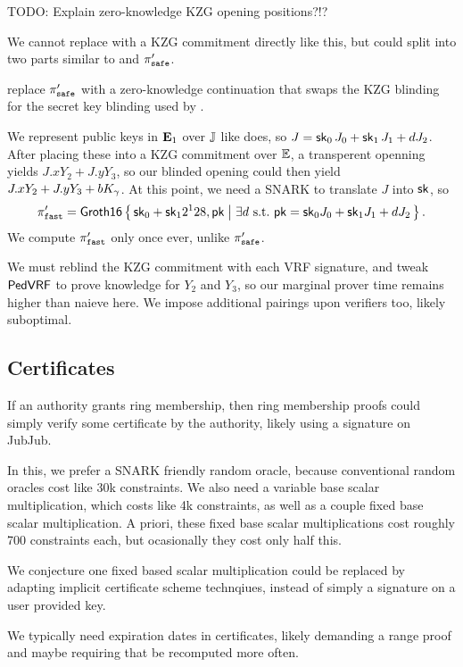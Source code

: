 TODO: Explain zero-knowledge KZG opening positions?!?

We cannot replace \pifast with a KZG commitment directly like this,
but could split \pifast into two parts similar to \pisafe and $\pi_{\mathtt{safe}}'$.

replace $\pi_{\mathtt{safe}}'$ with a zero-knowledge continuation
that swaps the KZG blinding for the secret key blinding used by \pifast.

We represent public keys in ${\mathbf{E}}_1$ over ${\mathbb{J}}$ like \pifast does,
so $J = \mathsf{sk}_0\, J_0 + \mathsf{sk}_1\, J_1 + d J_2$.
After placing these into a KZG commitment over ${\mathbb{E}}$, a transperent
openning yields $J.x Y_2 + J.y Y_3$, so our blinded opening could
then yield $J.x Y_2 + J.y Y_3 + b K_\gamma$.
At this point, we need a SNARK to translate $J$ into $\mathsf{sk}$, so
$$ \pifast' = \rrSNARK \Setst{ \sk_0 + \sk_1 2^128, \pk }{ 
 \exists d \textrm{\ s.t.\ }
 \pk = \sk_0 \genJ_0 + \sk_1 \genJ_1 + d \genJ_2
} \mathperiod $$
We compute $\pi_{\mathtt{fast}}'$ only once ever, unlike $\pi_{\mathtt{safe}}'$.

We must reblind the KZG commitment with each VRF signature, and
tweak ${\mathsf{PedVRF}}$ to prove knowledge for $Y_2$ and $Y_3$, so 
our marginal prover time remains higher than naieve \pifast here.
We impose additional pairings upon verifiers too, likely suboptimal.


\subsection{Certificates} %

If an authority grants ring membership, then ring membership proofs
could simply verify some certificate by the authority, likely using
a signature on JubJub.

In this, we prefer a SNARK friendly random oracle,
because conventional random oracles cost like 30k constraints.
We also need a variable base scalar multiplication, which costs like
4k constraints, as well as a couple fixed base scalar multiplication.
A priori, these fixed base scalar multiplications cost roughly 700
constraints each, but ocasionally they cost only half this.   

We conjecture one fixed based scalar multiplication could be replaced
by adapting implicit certificate scheme technqiues,
 instead of simply a signature on a user provided key.

We typically need expiration dates in certificates, likely demanding
a range proof and maybe requiring that \pifast be recomputed more often.

